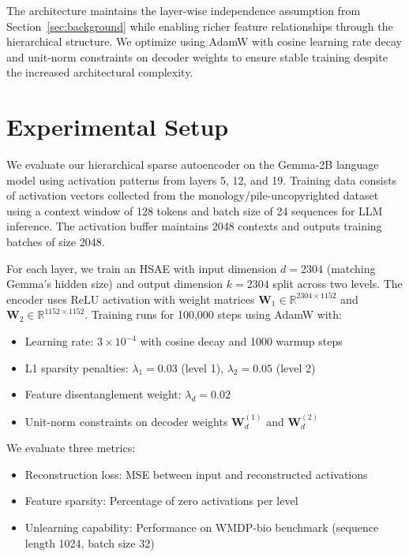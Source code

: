 \documentclass{article} %
\begin{document}
The architecture maintains the layer-wise independence assumption from Section~\ref{sec:background} while enabling richer feature relationships through the hierarchical structure. We optimize using AdamW with cosine learning rate decay and unit-norm constraints on decoder weights to ensure stable training despite the increased architectural complexity.

\section{Experimental Setup}
\label{sec:experimental}

We evaluate our hierarchical sparse autoencoder on the Gemma-2B language model using activation patterns from layers 5, 12, and 19. Training data consists of activation vectors collected from the monology/pile-uncopyrighted dataset using a context window of 128 tokens and batch size of 24 sequences for LLM inference. The activation buffer maintains 2048 contexts and outputs training batches of size 2048.

For each layer, we train an HSAE with input dimension $d=2304$ (matching Gemma's hidden size) and output dimension $k=2304$ split across two levels. The encoder uses ReLU activation with weight matrices $\mathbf{W}_1 \in \mathbb{R}^{2304 \times 1152}$ and $\mathbf{W}_2 \in \mathbb{R}^{1152 \times 1152}$. Training runs for 100,000 steps using AdamW with:

\begin{itemize}
    \item Learning rate: $3 \times 10^{-4}$ with cosine decay and 1000 warmup steps
    \item L1 sparsity penalties: $\lambda_1 = 0.03$ (level 1), $\lambda_2 = 0.05$ (level 2)
    \item Feature disentanglement weight: $\lambda_d = 0.02$
    \item Unit-norm constraints on decoder weights $\mathbf{W}_d^{(1)}$ and $\mathbf{W}_d^{(2)}$
\end{itemize}

We evaluate three metrics:
\begin{itemize}
    \item Reconstruction loss: MSE between input and reconstructed activations
    \item Feature sparsity: Percentage of zero activations per level
    \item Unlearning capability: Performance on WMDP-bio benchmark (sequence length 1024, batch size 32)
\end{itemize}
\end{document}
